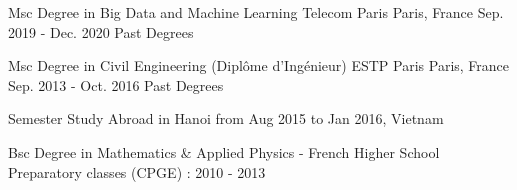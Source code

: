 

\begin{cventries}

  \cventry
    {Msc Degree in Big Data and Machine Learning} %
    {Telecom Paris} %
    {Paris, France} %
    {Sep. 2019 - Dec. 2020} %
    {Past Degrees} %
    {
      \begin{cvitems} %
      \end{cvitems}
    }

\cventry
{Msc Degree in Civil Engineering (Dipl\^ome d'Ing\'enieur)} %
{ESTP Paris} %
{Paris, France} %
{Sep. 2013 - Oct. 2016} %
{Past Degrees} %
{
  \begin{cvitems} %
    \item {Semester Study Abroad in Hanoi from Aug 2015 to Jan 2016, Vietnam}
    \item {Bsc Degree in Mathematics \& Applied Physics -  French Higher School Preparatory classes (CPGE) : 2010 - 2013}
  \end{cvitems}
}

\end{cventries}
